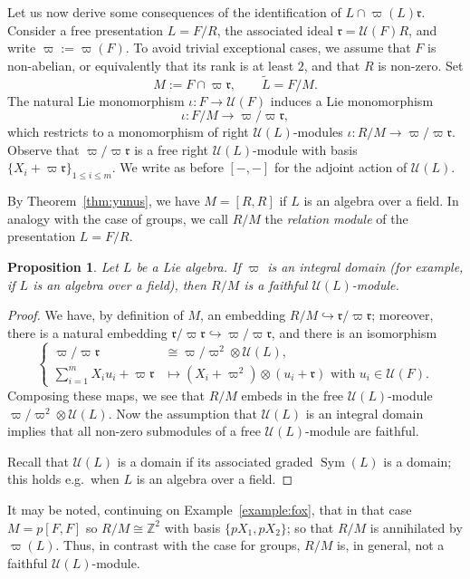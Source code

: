 \documentclass[a4paper,reqno,notitlepage]{amsart}
\newtheorem{prop}[theorem]{Proposition}
\theoremstyle{definition}
\newcommand{\Z}{\mathbb Z}
\newcommand\rr{{\mathfrak r}}
\newcommand\U{\mathscr U}
\begin{document}
Let us now derive some consequences of the identification of
$L\cap\varpi(L)\rr$. Consider a free presentation $L=F/R$, the
associated ideal $\rr=\U(F)R$, and write $\varpi:=\varpi(F)$. To avoid
trivial exceptional cases, we assume that $F$ is non-abelian, or
equivalently that its rank is at least $2$, and that $R$ is
non-zero. Set
\[M:=F\cap\varpi\rr,\qquad \widetilde L=F/M.
\]
The natural Lie monomorphism $\iota:F\to\U(F)$ induces a Lie
monomorphism
\[\iota\colon F/M\to\varpi/\varpi\rr,
\]
which restricts to a monomorphism of right $\U(L)$-modules
$\iota\colon R/M\to\varpi/\varpi\rr$. Observe that $\varpi/\varpi\rr$
is a free right $\U(L)$-module with basis $\{X_i+\varpi\rr\}_{1\le i\le
  m}$. We write as before $[-,-]$ for the adjoint action of $\U(L)$.

By Theorem~\ref{thm:yunus}, we have $M=[R,R]$ if $L$ is an algebra
over a field. In analogy with the case of groups, we call $R/M$ the
\emph{relation module} of the presentation $L=F/R$.
\begin{prop}\label{prop:faithful}
  Let $L$ be a Lie algebra. If $\varpi$ is an integral domain (for
  example, if $L$ is an algebra over a field), then $R/M$ is a
  faithful $\U(L)$-module.
\end{prop}
\begin{proof}
  We have, by definition of $M$, an embedding
  $R/M\hookrightarrow\rr/\varpi\rr$; moreover, there is a natural
  embedding $\rr/\varpi\rr\hookrightarrow\varpi/\varpi\rr$, and there
  is an isomorphism
  \[\left\{\begin{array}{rl}
    \varpi/\varpi\rr &\cong\varpi/\varpi^2\otimes\U(L),\\
    \displaystyle\sum_{i=1}^m X_iu_i+\varpi\rr &\mapsto (X_i+\varpi^2)\otimes(u_i+\rr)\text{ with }u_i\in\U(F).\end{array}\right.
  \]
  Composing these maps, we see that $R/M$ embeds in the free
  $\U(L)$-module $\varpi/\varpi^2\otimes\U(L)$. Now the assumption
  that $\U(L)$ is an integral domain implies that all non-zero
  submodules of a free $\U(L)$-module are faithful.

  Recall that $\U(L)$ is a domain if its associated graded
  $\operatorname{Sym}(L)$ is a domain; this holds e.g.\ when $L$ is an
  algebra over a field.
\end{proof}

It may be noted, continuing on Example~\ref{example:fox}, that in that
case $M=p[F,F]$ so $R/M\cong\Z^2$ with basis $\{pX_1,pX_2\}$; so that
$R/M$ is annihilated by $\varpi(L)$. Thus, in contrast with the case
for groups, $R/M$ is, in general, not a faithful $\U(L)$-module.
\end{document}
